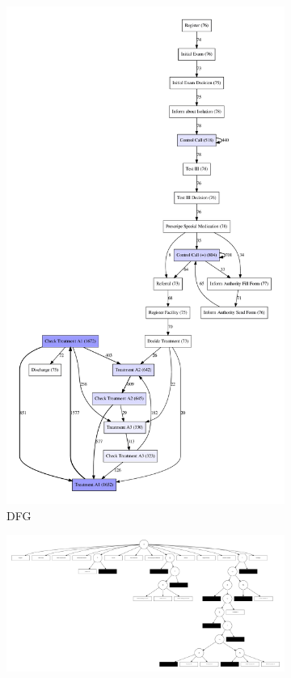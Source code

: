 \documentclass[12pt]{report}
\begin{document}
\begin{figure}[h]
    \centering
    \begin{subfigure}[b]{0.2\textwidth}
        \centering
	\includegraphics[width=\textwidth]{figures/q1_e_special.pdf}
        \caption{DFG}
        \label{fig:figures-q1_e_special-pdf}
    \end{subfigure}
    \hfill
    \begin{subfigure}[b]{0.7\textwidth}
        \centering
	\includegraphics[width=\textwidth]{figures/q1_e_tree_special.pdf}

\end{subfigure}
\end{figure}
\end{document}
